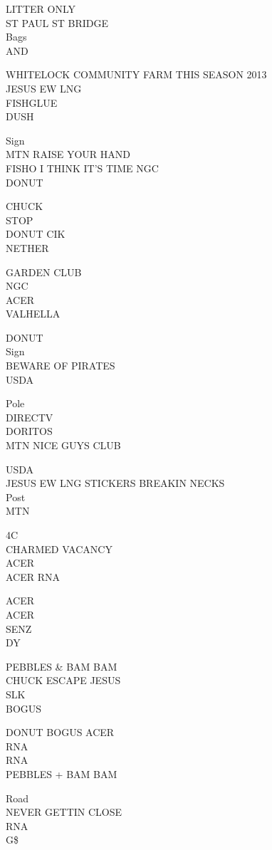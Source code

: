 \documentclass[10pt,letterpaper]{article}
\begin{document}
LITTER ONLY\\
ST PAUL ST BRIDGE\\
Bags\\
AND

WHITELOCK COMMUNITY FARM THIS SEASON 2013\\
JESUS EW LNG\\
FISHGLUE\\
DUSH

Sign\\
MTN RAISE YOUR HAND\\
FISHO I THINK IT'S TIME NGC\\
DONUT

CHUCK\\
STOP\\
DONUT CIK\\
NETHER

GARDEN CLUB\\
NGC\\
ACER\\
VALHELLA

DONUT\\
Sign\\
BEWARE OF PIRATES\\
USDA

Pole\\
DIRECTV\\
DORITOS\\
MTN NICE GUYS CLUB

USDA\\
JESUS EW LNG STICKERS BREAKIN NECKS\\
Post\\
MTN

4C\\
CHARMED VACANCY\\
ACER\\
ACER RNA

ACER\\
ACER\\
SENZ\\
DY

PEBBLES \& BAM BAM\\
CHUCK ESCAPE JESUS\\
SLK\\
BOGUS

DONUT BOGUS ACER\\
RNA\\
RNA\\
PEBBLES + BAM BAM

Road\\
NEVER GETTIN CLOSE\\
RNA\\
G\$
\end{document}
